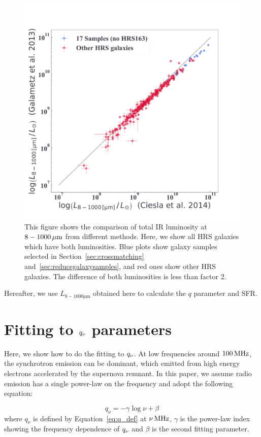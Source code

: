 \begin{figure}[htbp]
	\centering
	\includegraphics[width=.7\linewidth]{Chapter_4/Figures/Method_TIRcomparison.pdf}
    \caption[The comparison of total IR luminosities]{\label{fig:tircomparison}
        This figure shows the comparison of total IR luminosity at $8-1000\,\mathrm{\mu m}$ from different methods.
        Here, we show all HRS galaxies which have both luminosities.
        Blue plots show galaxy samples selected in Section~\ref{sec:crossmatching} and~\ref{sec:reducegalaxysamples}, and red ones show other HRS galaxies.
        The difference of both luminosities is less than factor 2.
    }
\end{figure}

Hereafter, we use $L_{8-1000\mathrm{\mu m}}$ obtained here to calculate the $q$ parameter and SFR\@.



\section{Fitting to $q_{\nu}$ parameters}\label{sec:fittingtoq}
Here, we show how to do the fitting to $q_{\nu}$.
At low frequencies around $100\,\mathrm{MHz}$, the synchrotron emission can be dominant, which emitted from high energy electrons accelerated by the supernova remnant.
In this paper, we assume radio emission has a single power-law on the frequency and adopt the following equation:

\begin{equation}\label{eq:q_fitting}
    q_{\nu} = -\gamma\log{\nu} + \beta
\end{equation}
where $q_{\nu}$ is defined by Equation~\ref{eq:q_def} at $\nu\,\mathrm{MHz}$, $\gamma$ is the power-law index showing the frequency dependence of $q_{\nu}$ and $\beta$ is the second fitting parameter.

